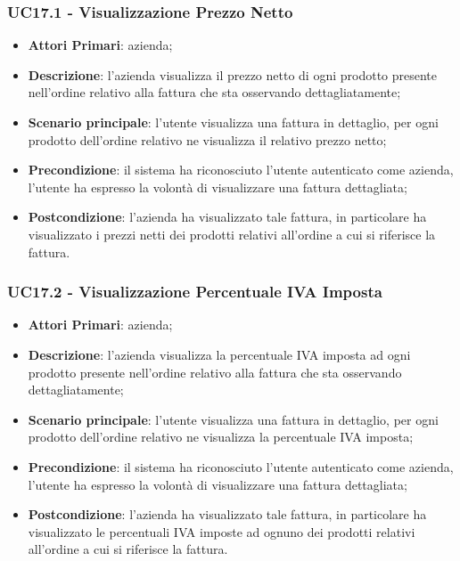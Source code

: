 \subsubsection{UC17.1 - Visualizzazione Prezzo Netto}
\begin{itemize}
	\item \textbf{Attori Primari}: azienda;
	\item \textbf{Descrizione}: l'azienda visualizza il prezzo netto di ogni prodotto presente nell'ordine relativo alla fattura che sta osservando dettagliatamente;
	\item \textbf{Scenario principale}: l'utente visualizza una fattura in dettaglio, per ogni prodotto dell'ordine relativo ne visualizza il relativo prezzo netto;
	\item \textbf{Precondizione}: il sistema ha riconosciuto l'utente autenticato come azienda, l'utente ha espresso la volontà di visualizzare una fattura dettagliata;
	\item \textbf{Postcondizione}: l'azienda ha visualizzato tale fattura, in particolare ha visualizzato i prezzi netti dei prodotti relativi all'ordine a cui si riferisce la fattura.
\end{itemize}
\subsubsection{UC17.2 - Visualizzazione Percentuale IVA Imposta}
\begin{itemize}
	\item \textbf{Attori Primari}: azienda;
	\item \textbf{Descrizione}: l'azienda visualizza la percentuale IVA imposta ad ogni prodotto presente nell'ordine relativo alla fattura che sta osservando dettagliatamente;
	\item \textbf{Scenario principale}: l'utente visualizza una fattura in dettaglio, per ogni prodotto dell'ordine relativo ne visualizza la percentuale IVA imposta;
	\item \textbf{Precondizione}: il sistema ha riconosciuto l'utente autenticato come azienda, l'utente ha espresso la volontà di visualizzare una fattura dettagliata;
	\item \textbf{Postcondizione}: l'azienda ha visualizzato tale fattura, in particolare ha visualizzato le percentuali IVA imposte ad ognuno dei prodotti relativi all'ordine a cui si riferisce la fattura.
\end{itemize}